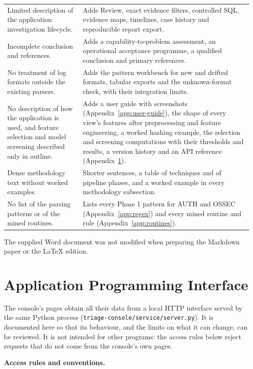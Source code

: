 \documentclass[11pt,a4paper]{article}
\begin{document}
\begin{longtable}{>{\RaggedRight\arraybackslash}p{}>{\RaggedRight\arraybackslash}p{}}
Limited description of the application investigation lifecycle. & Adds Review, exact evidence filters, controlled SQL, evidence maps, timelines, case history and reproducible report export. \\[3pt]
Incomplete conclusion and references. & Adds a capability-to-problem assessment, an operational acceptance programme, a qualified conclusion and primary references. \\[3pt]
No treatment of log formats outside the existing parsers. & Adds the pattern workbench for new and drifted formats, tabular exports and the unknown-format check, with their integration limits. \\[3pt]
No description of how the application is used, and feature selection and model screening described only in outline. & Adds a user guide with screenshots (Appendix~\ref{app:user-guide}), the shape of every view's features after preprocessing and feature engineering, a worked hashing example, the selection and screening computations with their thresholds and results, a version history and an API reference (Appendix~\ref{app:api}). \\[3pt]
Dense methodology text without worked examples. & Shorter sentences, a table of techniques and of pipeline phases, and a worked example in every methodology subsection. \\[3pt]
No list of the parsing patterns or of the mined routines. & Lists every Phase 1 pattern for AUTH and OSSEC (Appendix~\ref{app:regex}) and every mined routine and rule (Appendix~\ref{app:routines}). \\[3pt]
\end{longtable}
\endgroup


The supplied Word document was not modified when preparing the Markdown paper or the LaTeX edition.

\clearpage
\section{Application Programming Interface}
\label{app:api}

The console's pages obtain all their data from a local HTTP interface served by the same Python process (\nolinkurl{triage-console/service/server.py}). It is documented here so that its behaviour, and the limits on what it can change, can be reviewed. It is not intended for other programs: the access rules below reject requests that do not come from the console's own pages.

\textbf{Access rules and conventions.}
\end{document}
